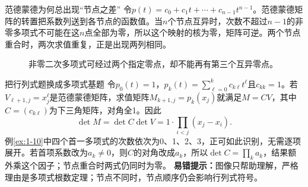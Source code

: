 \begin{insight}{范德蒙德为何总出现“节点之差”}
令$p(t)=c_0+c_1t+\cdots+c_{n-1}t^{n-1}$。范德蒙德矩阵的转置把系数列送到各节点的函数值。当$n$个节点互异时，次数不超过$n-1$的非零多项式不可能在这$n$点全部为零，所以这个映射的核为零，矩阵可逆。两个节点重合时，两次求值重复，正是出现两列相同。
\end{insight}
\begin{figure}[H]\centering
{}
\caption{非零二次多项式可经过两个指定零点，却不能再有第三个互异零点。}\label{fig:vander-roots}
\end{figure}
\begin{clevertrick}{把行列式题换成多项式基题}
令$p_0(t)=1$，$p_k(t)=\sum_{\ell=0}^k c_{k\ell}t^\ell$且$c_{kk}=1$。若$V_{\ell+1,j}=x_j^\ell$是范德蒙德矩阵，求值矩阵$M_{k+1,j}=p_k(x_j)$就满足$M=CV$，其中$C=(c_{k\ell})$为下三角矩阵，对角全1。因此
\[\det M=\det C\det V=1\cdot\prod_{i<j}(x_j-x_i).\]
例\ref{ex:1-10}中四个首一多项式的次数依次为0、1、2、3，正可如此识别，无需逐项展开。若首项系数改为$a_k\ne0$，则$C$的对角改成$a_k$，所以$\det C=\prod_k a_k$，结果额外乘这个因子；节点重合时两式仍同时为零。
\textbf{易错提示：}图像只帮助理解，严格理由是多项式根数定理；节点不同时，节点顺序仍会影响行列式符号。
\end{clevertrick}
